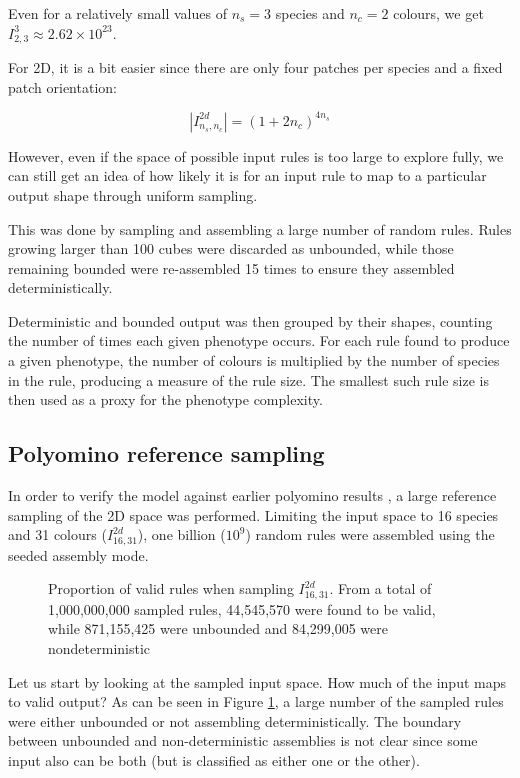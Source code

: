 Even for a relatively small values of \(n_s=3\) species and \(n_c=2\) colours, we get \(I_{2, 3}^3 \approx 2.62 \times 10^{23}\).

For 2D, it is a bit easier since there are only four patches per species and a fixed patch orientation:

\[
\left\lvert I_{n_s, n_c}^{2d}\right\rvert = (1+2n_c)^{4n_s}
\]

However, even if the space of possible input rules is too large to explore fully, we can still get an idea of how likely it is for an input rule to map to a particular output shape through uniform sampling.

This was done by sampling and assembling a large number of random rules. Rules growing larger than 100 cubes were discarded as unbounded, while those remaining bounded were re-assembled 15 times to ensure they assembled deterministically. 

Deterministic and bounded output was then grouped by their shapes, counting the number of times each given phenotype occurs. For each rule found to produce a given phenotype, the number of colours is multiplied by the number of species in the rule, producing a measure of the rule size. The smallest such rule size is then used as a proxy for the phenotype complexity.

\subsection{Polyomino reference sampling}
\label{sec:refcalc}
In order to verify the model against earlier polyomino results \cite{johnston2021}, a large reference sampling of the 2D space was performed. Limiting the input space to 16 species and 31 colours (\(I_{16,31}^{2d}\)), one billion (\(10^9\)) random rules were assembled using the seeded assembly mode.

\begin{figure}[h]
    \centering
    \caption{Proportion of valid rules when sampling \(I_{16,31}^{2d}\). From a total of 1,000,000,000 sampled rules, 44,545,570 were found to be valid, while 871,155,425 were  unbounded and 84,299,005 were nondeterministic}
    \label{fig:ref_validity}
\end{figure}

Let us start by looking at the sampled input space. How much of the input maps to valid output? As can be seen in Figure \ref{fig:ref_validity}, a large number of the sampled rules were either unbounded or not assembling deterministically. The boundary between unbounded and non-deterministic assemblies is not clear since some input also can be both (but is classified as either one or the other).

